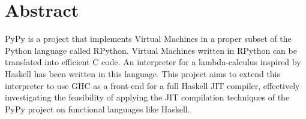 
\chapter*{Abstract}

PyPy is a project that implements Virtual Machines in a proper subset of
the Python language called RPython. Virtual Machines written in RPython
can be translated into efficient C code. An interpreter for a lambda-calculus inspired by
Haskell has been written in this language.
This project aims to extend this interpreter to use GHC as a front-end for
a full Haskell JIT compiler, effectively investigating the feasibility
of applying the JIT compilation techniques of the PyPy project on functional
languages like Haskell.

